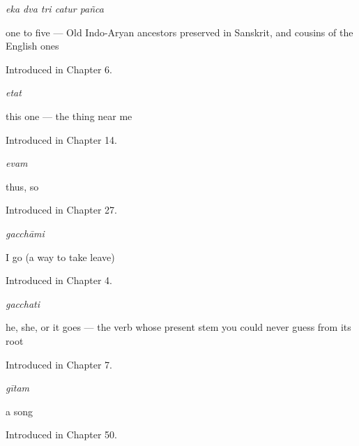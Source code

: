 \noindent\begin{minipage}[t]{\linewidth}
\raggedright
\textbf{    }\enspace\emph{eka dva tri catur pañca}\par
\small one to five — Old Indo-Aryan ancestors preserved in Sanskrit, and cousins of the English ones\par
\footnotesize Introduced in Chapter 6.
\end{minipage}\par\medskip

\noindent\begin{minipage}[t]{\linewidth}
\raggedright
\textbf{}\enspace\emph{etat}\par
\small this one — the thing near me\par
\footnotesize Introduced in Chapter 14.
\end{minipage}\par\medskip

\noindent\begin{minipage}[t]{\linewidth}
\raggedright
\textbf{}\enspace\emph{evam}\par
\small thus, so\par
\footnotesize Introduced in Chapter 27.
\end{minipage}\par\medskip

\noindent\begin{minipage}[t]{\linewidth}
\raggedright
\textbf{}\enspace\emph{gacchāmi}\par
\small I go (a way to take leave)\par
\footnotesize Introduced in Chapter 4.
\end{minipage}\par\medskip

\noindent\begin{minipage}[t]{\linewidth}
\raggedright
\textbf{}\enspace\emph{gacchati}\par
\small he, she, or it goes — the verb whose present stem you could never guess from its root\par
\footnotesize Introduced in Chapter 7.
\end{minipage}\par\medskip

\noindent\begin{minipage}[t]{\linewidth}
\raggedright
\textbf{}\enspace\emph{gītam}\par
\small a song\par
\footnotesize Introduced in Chapter 50.
\end{minipage}\par\medskip

